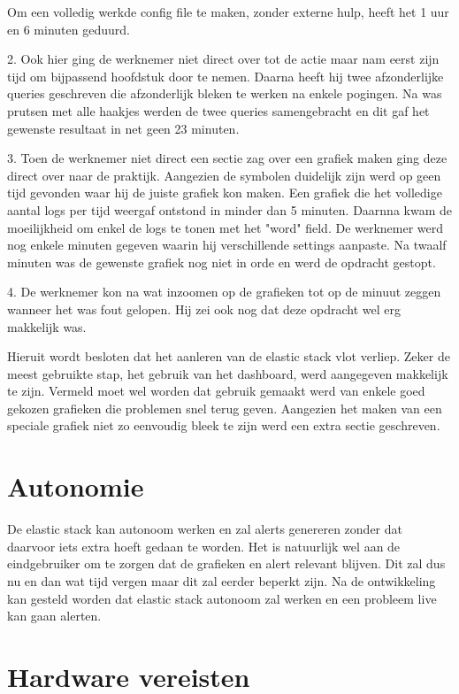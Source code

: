Om een volledig werkde config file te maken, zonder externe hulp, heeft het 1 uur en 6 minuten geduurd.

2. Ook hier ging de werknemer niet direct over tot de actie maar nam eerst zijn tijd om bijpassend hoofdstuk door te nemen. 
Daarna heeft hij twee afzonderlijke queries geschreven die afzonderlijk bleken te werken na enkele pogingen. Na was prutsen met alle haakjes werden de twee queries samengebracht en dit gaf het gewenste resultaat in net geen 23 minuten.

3. Toen de werknemer niet direct een sectie zag over een grafiek maken ging deze direct over naar de praktijk. Aangezien de symbolen duidelijk zijn werd op geen tijd gevonden waar hij de juiste grafiek kon maken.
Een grafiek die het volledige aantal logs per tijd weergaf ontstond in minder dan 5 minuten. Daarnna kwam de moeilijkheid om enkel de logs te tonen met het "word" field. 
De werknemer werd nog enkele minuten gegeven waarin hij verschillende settings aanpaste. Na twaalf minuten was de gewenste grafiek nog niet in orde en werd de opdracht gestopt.

4. De werknemer kon na wat inzoomen op de grafieken tot op de minuut zeggen wanneer het was fout gelopen. Hij zei ook nog dat deze opdracht wel erg makkelijk was.
	

Hieruit wordt besloten dat het aanleren van de elastic stack vlot verliep. Zeker de meest gebruikte stap, het gebruik van het dashboard, werd aangegeven makkelijk te zijn.
Vermeld moet wel worden dat gebruik gemaakt werd van enkele goed gekozen grafieken die problemen snel terug geven. 
Aangezien het maken van een speciale grafiek niet zo eenvoudig bleek te zijn werd een extra sectie geschreven. 
	
\section{Autonomie}
\label{sec:autonomie}	
	
De elastic stack kan autonoom werken en zal alerts genereren zonder dat daarvoor iets extra hoeft gedaan te worden. 
Het is natuurlijk wel aan de eindgebruiker om te zorgen dat de grafieken en alert relevant blijven. Dit zal dus nu en dan wat tijd vergen maar dit zal eerder beperkt zijn. 
Na de ontwikkeling kan gesteld worden dat elastic stack autonoom zal werken en een probleem live kan gaan alerten. 
	
	
\section{Hardware vereisten}
\label{sec:hardware-vereisten}
	

